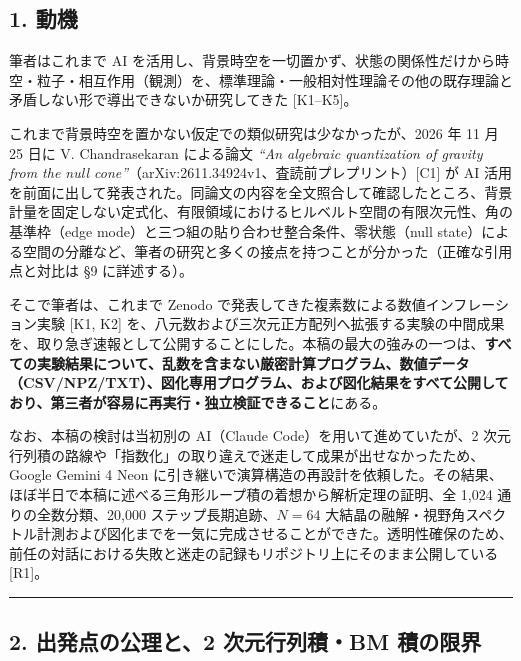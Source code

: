 \documentclass[
  a4paper,
]{ltjsarticle}
\begin{document}
\subsection{1. 動機}\label{ux52d5ux6a5f}

筆者はこれまで AI
を活用し、背景時空を一切置かず、状態の関係性だけから時空・粒子・相互作用（観測）を、標準理論・一般相対性理論その他の既存理論と矛盾しない形で導出できないか研究してきた
{[}K1--K5{]}。

これまで背景時空を置かない仮定での類似研究は少なかったが、2026 年 11 月
25 日に V. Chandrasekaran による論文 \emph{``An algebraic quantization
of gravity from the null
cone''}（arXiv:2611.34924v1、査読前プレプリント）{[}C1{]} が AI
活用を前面に出して発表された。同論文の内容を全文照合して確認したところ、背景計量を固定しない定式化、有限領域におけるヒルベルト空間の有限次元性、角の基準枠（edge
mode）と三つ組の貼り合わせ整合条件、零状態（null
state）による空間の分離など、筆者の研究と多くの接点を持つことが分かった（正確な引用点と対比は
§9 に詳述する）。

そこで筆者は、これまで Zenodo
で発表してきた複素数による数値インフレーション実験 {[}K1, K2{]}
を、八元数および三次元正方配列へ拡張する実験の中間成果を、取り急ぎ速報として公開することにした。本稿の最大の強みの一つは、\textbf{すべての実験結果について、乱数を含まない厳密計算プログラム、数値データ（CSV/NPZ/TXT）、図化専用プログラム、および図化結果をすべて公開しており、第三者が容易に再実行・独立検証できること}にある。

なお、本稿の検討は当初別の AI（Claude Code）を用いて進めていたが、2
次元行列積の路線や「指数化」の取り違えで迷走して成果が出せなかったため、Google
Gemini 4 Neon
に引き継いで演算構造の再設計を依頼した。その結果、ほぼ半日で本稿に述べる三角形ループ積の着想から解析定理の証明、全
1,024 通りの全数分類、20,000 ステップ長期追跡、\(N = 64\)
大結晶の融解・視野角スペクトル計測および図化までを一気に完成させることができた。透明性確保のため、前任の対話における失敗と迷走の記録もリポジトリ上にそのまま公開している
{[}R1{]}。

\begin{center}\rule{0.5\linewidth}{0.5pt}\end{center}

\subsection{2. 出発点の公理と、2 次元行列積・BM
積の限界}\label{ux51faux767aux70b9ux306eux516cux7406ux30682-ux6b21ux5143ux884cux5217ux7a4dbm-ux7a4dux306eux9650ux754c}
\end{document}
